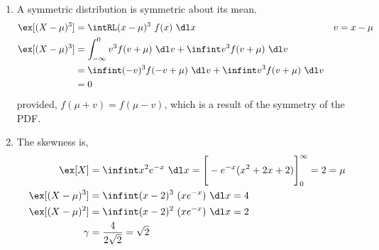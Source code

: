 \begin{enumerate}
\begin{enumerate}
              \item A symmetric distribution is symmetric about its mean.
                    \begin{align}
                        \ex[(X-\mu)^3] & = \intRL (x-\mu)^3\ f(x)\ \dl x          &
                        v              & = x-\mu                                    \\
                        \ex[(X-\mu)^3] & = \int_{-\infty}^{0} v^3 f(v+\mu)\ \dl v
                        + \infint v^3 f(v+\mu)\ \dl v                               \\
                                       & = \infint (-v)^3 f(-v+\mu)\ \dl v
                        + \infint v^3 f(v+\mu)\ \dl v                               \\
                                       & = 0
                    \end{align}
                    provided, $ f(\mu+v) = f(\mu-v) $, which is a result of the symmetry
                    of the PDF.

              \item The skewness is,
                    \begin{align}
                        \ex[X]         & = \infint x^2e^{-x}\ \dl x = \Bigg[-e^{-x}
                        (x^2 + 2x + 2) \Bigg]_0^\infty = 2 = \mu                    \\
                        \ex[(X-\mu)^3] & = \infint (x-2)^3\ (xe^{-x})\ \dl x = 4    \\
                        \ex[(X-\mu)^2] & = \infint (x-2)^2\ (xe^{-x})\ \dl x = 2    \\
                        \gamma         & = \frac{4}{2\sqrt{2}} = \sqrt{2}
                    \end{align}
                    \begin{figure}[H]
                        \centering
                    \end{figure}


\end{enumerate}
\end{enumerate}
